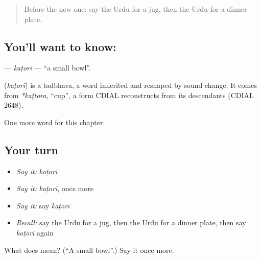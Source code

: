 \label{lesson:UR-C224-katori}



\begin{quote}
Before the new one: say the Urdu for a jug, then the Urdu for a dinner plate.
\end{quote}

\subsection*{You'll want to know: }
\textbf{} — \emph{kaṭorī} — \textquotedblleft{}a small bowl\textquotedblright{}.

\begin{cousinweb}
\textbf{} (\emph{kaṭorī}) is a tadbhava, a word inherited and reshaped by sound change. It comes from \emph{*kaṭṭora}, \textquotedblleft{}cup\textquotedblright{}, a form CDIAL reconstructs from its descendants (CDIAL 2648).
\end{cousinweb}

\begin{grammarlens}[title={What you've built}]
One more word for this chapter.
\end{grammarlens}

\subsection*{Your turn}
\begin{itemize}
\raggedright
  \item \emph{Say it:} \emph{kaṭorī}
  \item \emph{Say it:} \emph{kaṭorī}, once more
  \item \emph{Say it:} say \emph{kaṭorī}
  \item \emph{Recall:} say the Urdu for a jug, then the Urdu for a dinner plate, then say \emph{kaṭorī} again
\end{itemize}

\begin{tcolorbox}[breakable,colback=teal!4,colframe=teal!35!black,title={Before you move on}]
What does  mean? (\textquotedblleft{}A small bowl\textquotedblright{}.) Say it once more.
\end{tcolorbox}
